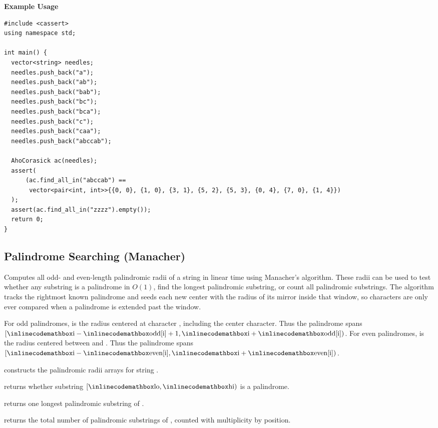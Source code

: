 \textbf{Example Usage}\par
\begin{lstlisting}[style=cpp]
#include <cassert>
using namespace std;

int main() {
  vector<string> needles;
  needles.push_back("a");
  needles.push_back("ab");
  needles.push_back("bab");
  needles.push_back("bc");
  needles.push_back("bca");
  needles.push_back("c");
  needles.push_back("caa");
  needles.push_back("abccab");

  AhoCorasick ac(needles);
  assert(
      (ac.find_all_in("abccab") ==
       vector<pair<int, int>>{{0, 0}, {1, 0}, {3, 1}, {5, 2}, {5, 3}, {0, 4}, {7, 0}, {1, 4}})
  );
  assert(ac.find_all_in("zzzz").empty());
  return 0;
}
\end{lstlisting}
\subsection{Palindrome Searching (Manacher)}
\label{sec:3.3.5}
Computes all odd- and even-length palindromic radii of a string in linear time using Manacher's algorithm. These radii can be used to test whether any substring is a palindrome in $O(1)$, find the longest palindromic substring, or count all palindromic substrings. The algorithm tracks the rightmost known palindrome and seeds each new center with the radius of its mirror inside that window, so characters are only ever compared when a palindrome is extended past the window.

For odd palindromes,  is the radius centered at character , including the center character. Thus the palindrome spans $[{\inlinecodemath{i}} - {\inlinecodemath{odd[i]}} + 1, {\inlinecodemath{i}} + {\inlinecodemath{odd[i]}})$. For even palindromes,  is the radius centered between  and . Thus the palindrome spans $[{\inlinecodemath{i}} - {\inlinecodemath{even[i]}}, {\inlinecodemath{i}} + {\inlinecodemath{even[i]}})$.

\begin{compactitem}
  \item {} constructs the palindromic radii arrays for string .
  \item {} returns whether substring $[{\inlinecodemath{lo}}, {\inlinecodemath{hi}})$ is a palindrome.
  \item {} returns one longest palindromic substring of .
  \item {} returns the total number of palindromic substrings of , counted with multiplicity by position.
\end{compactitem}

